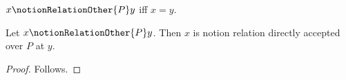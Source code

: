 

\begin{definition}\label{notion_relation_other}
    $x\notionRelationOther{P}y$ iff $x=y$.
\end{definition}

\begin{proposition}\label{notion_relation_exact_negative}
    Let $x\notionRelationOther{P}y$.
    Then $x$ is notion relation directly accepted over $P$ at $y$.
\end{proposition}
\begin{proof}
    Follows.
\end{proof}
